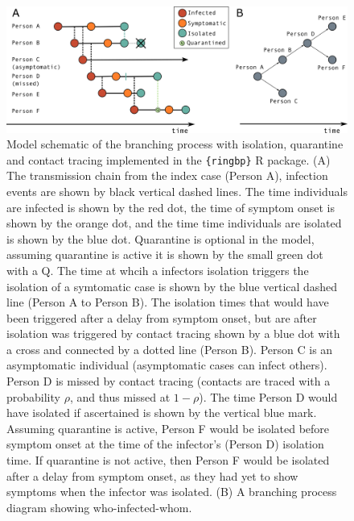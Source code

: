 \documentclass{article}
\begin{document}
\begin{figure}[ht]
\centering
\includegraphics[width=\textwidth]{../plots/model-schematic.png}
\caption{Model schematic of the branching process with isolation, quarantine and contact tracing implemented in the \texttt{\{ringbp\}} R package. (A) The transmission chain from the index case (Person A), infection events are shown by black vertical dashed lines. The time individuals are infected is shown by the red dot, the time of symptom onset is shown by the orange dot, and the time time individuals are isolated is shown by the blue dot. Quarantine is optional in the model, assuming quarantine is active it is shown by the small green dot with a Q. The time at whcih a infectors isolation triggers the isolation of a symtomatic case is shown by the blue vertical dashed line (Person A to Person B). The isolation times that would have been triggered after a delay from symptom onset, but are after isolation was triggered by contact tracing shown by a blue dot with a cross and connected by a dotted line (Person B). Person C is an asymptomatic individual (asymptomatic cases can infect others). Person D is missed by contact tracing (contacts are traced with a probability $\rho$, and thus missed at $1 - \rho$). The time Person D would have isolated if ascertained is shown by the vertical blue mark. Assuming quarantine is active, Person F would be isolated before symptom onset at the time of the infector's (Person D) isolation time. If quarantine is not active, then Person F would be isolated after a delay from symptom onset, as they had yet to show symptoms when the infector was isolated. (B) A branching process diagram showing who-infected-whom.}
\label{fig:ringbp-model}
\end{figure}
\end{document}

